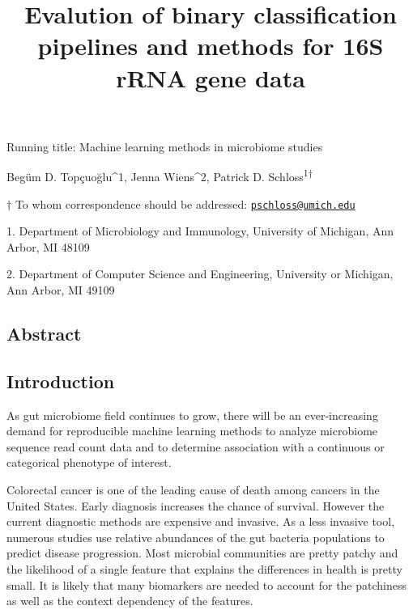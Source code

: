 \documentclass[11pt,]{article}
\title{\textbf{Evalution of binary classification pipelines and methods for 16S
rRNA gene data}}
\author{}
\date{}
\begin{document}
\maketitle

\vspace{35mm}

Running title: Machine learning methods in microbiome studies

\vspace{35mm}

Begüm D. Topçuoğlu\^{}1, Jenna Wiens\^{}2, Patrick D.
Schloss\textsuperscript{1\(\dagger\)}

\vspace{40mm}

\(\dagger\) To whom correspondence should be addressed:
\href{mailto:pschloss@umich.edu}{\nolinkurl{pschloss@umich.edu}}

1. Department of Microbiology and Immunology, University of Michigan,
Ann Arbor, MI 48109

2. Department of Computer Science and Engineering, University or
Michigan, Ann Arbor, MI 49109

\newpage

\linenumbers

\subsection{Abstract}\label{abstract}

\newpage

\subsection{Introduction}\label{introduction}

As gut microbiome field continues to grow, there will be an
ever-increasing demand for reproducible machine learning methods to
analyze microbiome sequence read count data and to determine association
with a continuous or categorical phenotype of interest.

Colorectal cancer is one of the leading cause of death among cancers in
the United States. Early diagnosis increases the chance of survival.
However the current diagnostic methods are expensive and invasive. As a
less invasive tool, numerous studies use relative abundances of the gut
bacteria populations to predict disease progression. Most microbial
communities are pretty patchy and the likelihood of a single feature
that explains the differences in health is pretty small. It is likely
that many biomarkers are needed to account for the patchiness as well as
the context dependency of the features.
\end{document}
